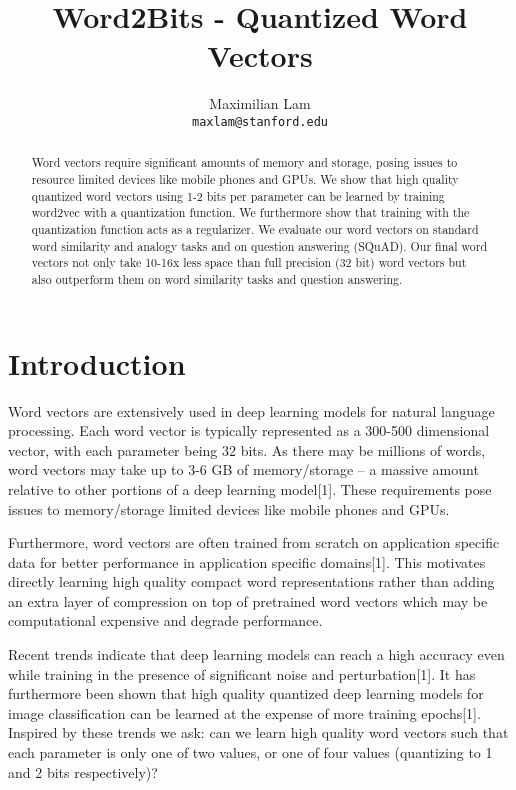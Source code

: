 \documentclass{article} %
\title{Word2Bits - Quantized Word Vectors}
\author{
Maximilian Lam\\
\texttt{maxlam@stanford.edu} \\
}
\begin{document}
\maketitle

\begin{abstract}
Word vectors require significant amounts of memory and storage, posing
issues to resource limited devices like mobile phones and GPUs. We
show that high quality quantized word vectors using 1-2 bits per
parameter can be learned by training word2vec with a quantization
function. We furthermore show that training with the quantization
function acts as a regularizer. We evaluate our word vectors on
standard word similarity and analogy tasks and on question answering
(SQuAD). Our final word vectors not only take 10-16x less space than
full precision (32 bit) word vectors but also outperform them on word
similarity tasks and question answering.
\end{abstract}

\section{Introduction}
Word vectors are extensively used in deep learning models for natural
language processing. Each word vector is typically represented as a
300-500 dimensional vector, with each parameter being 32 bits. As
there may be millions of words, word vectors may take up to 3-6 GB of
memory/storage -- a massive amount relative to other portions of a
deep learning model[1]. These requirements pose issues to
memory/storage limited devices like mobile phones and GPUs.

Furthermore, word vectors are often trained from scratch on application specific
data for better performance in application specific domains[1]. This
motivates directly learning high quality compact word representations
rather than adding an extra layer of compression on top of pretrained
word vectors which may be computational expensive and degrade
performance.

Recent trends indicate that deep learning models can reach a high
accuracy even while training in the presence of significant noise and
perturbation[1]. It has furthermore been shown that high quality
quantized deep learning models for image classification can be learned
at the expense of more training epochs[1]. Inspired by these trends we
ask: can we learn high quality word vectors such that each parameter
is only one of two values, or one of four values (quantizing to 1 and
2 bits respectively)?
\end{document}
